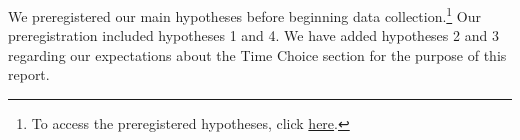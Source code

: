 \documentclass[11pt,a4paper,oneside]{article}
\begin{document}


We preregistered our main hypotheses before beginning data collection.\footnote{To access the preregistered hypotheses, click \href{https://doi.org/10.17605/OSF.IO/MFKBC}{here}.} Our preregistration included hypotheses 1 and 4. We have added hypotheses 2 and 3 regarding our expectations about the Time Choice section for the purpose of this report.
\end{document}
